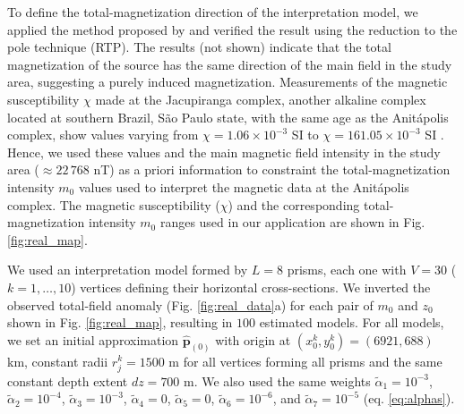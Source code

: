 To define the total-magnetization direction of the interpretation model, 
we applied the method proposed by \citet{oliveirajr-etal2015} and verified the 
result using the reduction to the pole technique (RTP). The results (not shown) 
indicate that the total magnetization of the source has the same direction of the 
main field in the study area, suggesting a purely induced magnetization.
Measurements of the magnetic susceptibility $\chi$ made at the Jacupiranga complex,
another alkaline complex located at southern Brazil, São Paulo state, 
with the same age as the Anit{\'a}polis complex, 
show values varying from $\chi = 1.06 \times 10^{-3}$ SI to 
$\chi = 161.05 \times 10^{-3}$ SI \citep[][ tb. 1]{valdivia-2009}.
Hence, we used these values and the main magnetic field intensity in the study area 
($\approx 22 \, 768 $ nT) as a priori information to constraint the 
total-magnetization intensity $m_{0}$ values used to interpret the magnetic data 
at the Anit{\'a}polis complex.
The magnetic susceptibility ($ \chi $) and the corresponding total-magnetization 
intensity $m_{0}$ ranges used in our application are shown in Fig. \ref{fig:real_map}.

We used an interpretation model formed by $L = 8$ prisms, each one with 
$V = 30$ ($k = 1, \dots , 10$) vertices defining their horizontal cross-sections.
We inverted the observed total-field anomaly (Fig. \ref{fig:real_data}a) for each 
pair of $m_0$ and $z_0$ shown in Fig. \ref{fig:real_map}, resulting in $100$ estimated 
models. 
For all models, we set an initial approximation $\hat{\mathbf{p}}_{(0)}$ with origin 
at $(x_0^k, y_0^k) = (6921, 688)$ km, constant radii $r_j^k = 1500$ m for 
all vertices forming all prisms and the same constant depth extent $dz = 700$ m.
We also used the same weights $\tilde{\alpha}_1 = 10^{-3}$, 
$\tilde{\alpha}_2 = 10^{-4}$, 
$\tilde{\alpha}_3 = 10^{-3}$, $\tilde{\alpha}_4 = 0$, $\tilde{\alpha}_5 = 0$, 
$\tilde{\alpha}_6 = 10^{-6}$, and $\tilde{\alpha}_7 = 10^{-5}$ (eq. \ref{eq:alphas}). 

